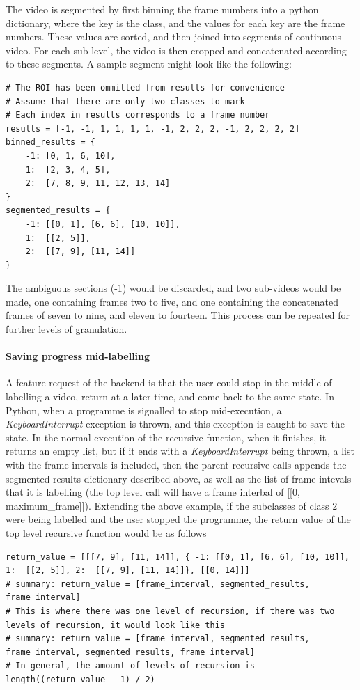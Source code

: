     The video is segmented by first binning the frame numbers into a python dictionary, where the key is the class, and the values for each key are the frame numbers. These values are sorted, and then joined into segments of continuous video. For each sub level, the video is then cropped and concatenated according to these segments. A sample segment might look like the following:
    \begin{lstlisting}[style=PythonStyle]
# The ROI has been ommitted from results for convenience
# Assume that there are only two classes to mark
# Each index in results corresponds to a frame number
results = [-1, -1, 1, 1, 1, 1, -1, 2, 2, 2, -1, 2, 2, 2, 2]
binned_results = {
    -1: [0, 1, 6, 10],
    1:  [2, 3, 4, 5],
    2:  [7, 8, 9, 11, 12, 13, 14]
}
segmented_results = {
    -1: [[0, 1], [6, 6], [10, 10]],
    1:  [[2, 5]],
    2:  [[7, 9], [11, 14]]
}\end{lstlisting}
    The ambiguous sections (-1) would be discarded, and two sub-videos would be made, one containing frames two to five, and one containing the concatenated frames of seven to nine, and eleven to fourteen. This process can be repeated for further levels of granulation.

    \paragraph{Saving progress mid-labelling}
    A feature request of the backend is that the user could stop in the middle of labelling a video, return at a later time, and come back to the same state. In Python, when a programme is signalled to stop mid-execution, a {\slshape KeyboardInterrupt} exception is thrown, and this exception is caught to save the state. In the normal execution of the recursive function, when it finishes, it returns an empty list, but if it ends with a {\slshape KeyboardInterrupt} being thrown, a list with the frame intervals is included, then the parent recursive calls appends the segmented results dictionary described above, as well as the list of frame intevals that it is labelling (the top level call will have a frame interbal of [[0, maximum\_frame]]). Extending the above example, if the subclasses of class 2 were being labelled and the user stopped the programme, the return value of the top level recursive function would be as follows

    \begin{lstlisting}[style=PythonStyle]
return_value = [[[7, 9], [11, 14]], { -1: [[0, 1], [6, 6], [10, 10]], 1:  [[2, 5]], 2:  [[7, 9], [11, 14]]}, [[0, 14]]]
# summary: return_value = [frame_interval, segmented_results, frame_interval]
# This is where there was one level of recursion, if there was two levels of recursion, it would look like this
# summary: return_value = [frame_interval, segmented_results, frame_interval, segmented_results, frame_interval]
# In general, the amount of levels of recursion is length((return_value - 1) / 2)\end{lstlisting}

